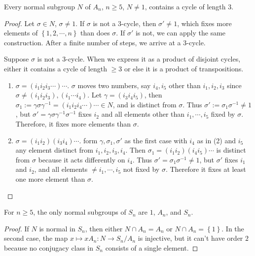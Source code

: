 \begin{lemma}
  Every normal subgroup \( N \) of \( A_n \), \( n \geq 5 \), \( N \neq 1 \), contains a cycle of length \( 3 \).
\end{lemma}
\begin{proof}
  Let \( \sigma \in N \), \( \sigma \neq 1 \).
  If \( \sigma \) is not a \( 3 \)-cycle, then \( \sigma' \neq 1 \), which fixes more elements of \( \left\lbrace 1, 2, \cdots, n \right\rbrace \) than does \( \sigma \).
  If \( \sigma' \) is not, we can apply the same construction.
  After a finite number of steps, we arrive at a \( 3 \)-cycle.

  Suppose \( \sigma \) is not a \( 3 \)-cycle.
  When we express it as a product of disjoint cycles, either it contains a cycle of length \( \geq 3 \) or else it is a product of transpositions.
  \begin{enumerate}
    \item \( \sigma = (i_1 i_2 i_3 \cdots) \cdots \).
      \( \sigma \) moves two numbers, say \( i_4, i_5 \) other than \( i_1, i_2, i_3 \) since \( \sigma \neq (i_1 i_2 i_3), (i_1 \cdots i_4) \).
      Let \( \gamma = (i_3 i_4 i_5) \), then \( \sigma_1 := \gamma \sigma \gamma^{-1} = (i_1 i_2 i_4 \cdots) \cdots \in N \), and is distinct from \( \sigma \).
      Thus \( \sigma' := \sigma_1 \sigma^{-1} \neq 1 \), but \( \sigma' = \gamma \sigma \gamma^{-1} \sigma^{-1} \) fixes \( i_2 \) and all elements other than \( i_1, \cdots, i_5 \) fixed by \( \sigma \).
      Therefore, it fixes more elements than \( \sigma \).
    \item \( \sigma = (i_1 i_2)(i_3 i_4) \cdots \).
      form \( \gamma, \sigma_1, \sigma' \) as the first case with \( i_4 \) as in (2) and \( i_5 \) any element distinct from \( i_1, i_2, i_3, i_4 \).
      Then \( \sigma_1 = (i_1 i_2)(i_4 i_5) \cdots \) is distinct from \( \sigma \) because it acts differently on \( i_4 \).
      Thus \( \sigma' = \sigma_1 \sigma^{-1} \neq 1 \), but \( \sigma' \) fixes \( i_1 \) and \( i_2 \), and all elements \( \neq i_1, \cdots, i_5 \) not fixed by \( \sigma \).
      Therefore it fixes at least one more element than \( \sigma \).
  \end{enumerate}
\end{proof}

\begin{corollary}
  For \( n \geq 5 \), the only normal subgroups of \( S_n \) are \( 1 \), \( A_n \), and \( S_n \).
\end{corollary}
\begin{proof}
  If \( N \) is normal in \( S_n \), then either \( N \cap A_n = A_n \) or \( N \cap A_n = \left\lbrace 1 \right\rbrace \).
  In the second case, the map \( x \mapsto x A_n: N \to S_n / A_n \) is injective, but it can't have order \( 2 \) because no conjugacy class in \( S_n \) consists of a single element.
\end{proof}

